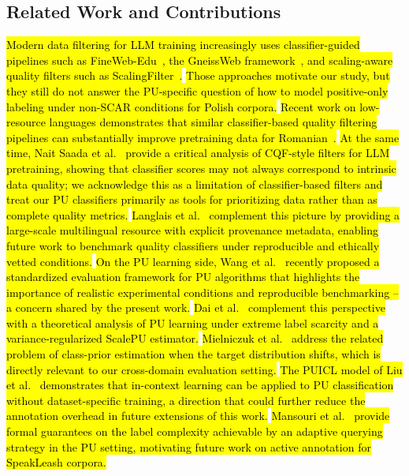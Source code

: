 \documentclass[applsci,article,submit,pdftex,moreauthors]{Definitions/mdpi}
\newcommand{\rev}[1]{\hl{#1}}
\begin{document}
\subsection{Related Work and Contributions}

\rev{Modern data filtering for LLM training increasingly uses classifier-guided pipelines such as FineWeb-Edu~\cite{penedo2024fineweb}, the GneissWeb framework~\cite{emami2026gneissweb}, and scaling-aware quality filters such as ScalingFilter~\cite{li2024scalingfilter}.} \rev{Those approaches motivate our study, but they still do not answer the PU-specific question of how to model positive-only labeling under non-SCAR conditions for Polish corpora.} \rev{Recent work on low-resource languages demonstrates that similar classifier-based quality filtering pipelines can substantially improve pretraining data for Romanian~\cite{negoita2026romanianllm}.} \rev{At the same time, Nait Saada et al.~\cite{saada2026cqf} provide a critical analysis of CQF-style filters for LLM pretraining, showing that classifier scores may not always correspond to intrinsic data quality; we acknowledge this as a limitation of classifier-based filters and treat our PU classifiers primarily as tools for prioritizing data rather than as complete quality metrics.} \rev{Langlais et al.~\cite{langlais2026commoncorpus} complement this picture by providing a large-scale multilingual resource with explicit provenance metadata, enabling future work to benchmark quality classifiers under reproducible and ethically vetted conditions.} \rev{On the PU learning side, Wang et al.~\cite{wang2026pubenchmark} recently proposed a standardized evaluation framework for PU algorithms that highlights the importance of realistic experimental conditions and reproducible benchmarking -- a concern shared by the present work.} \rev{Dai et al.~\cite{dai2026scalepu} complement this perspective with a theoretical analysis of PU learning under extreme label scarcity and a variance-regularized ScalePU estimator.} \rev{Mielniczuk et al.~\cite{mielniczuk2026priorshift} address the related problem of class-prior estimation when the target distribution shifts, which is directly relevant to our cross-domain evaluation setting.} \rev{The PUICL model of Liu et al.~\cite{liu2026puicl} demonstrates that in-context learning can be applied to PU classification without dataset-specific training, a direction that could further reduce the annotation overhead in future extensions of this work.} \rev{Mansouri et al.~\cite{mansouri2026activepu} provide formal guarantees on the label complexity achievable by an adaptive querying strategy in the PU setting, motivating future work on active annotation for SpeakLeash corpora.}
\end{document}
